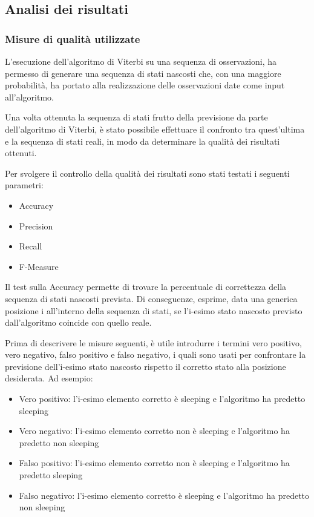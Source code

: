 \documentclass[10pt,a4paper]{article}
\begin{document}
	
	\subsection{Analisi dei risultati}
	
	
	\subsubsection{Misure di qualità utilizzate}
	
	L'esecuzione dell'algoritmo di Viterbi su una sequenza di osservazioni, ha permesso di generare una sequenza di stati nascosti che, con una maggiore probabilità, ha portato alla realizzazione delle osservazioni date come input all'algoritmo.
	
	Una volta ottenuta la sequenza di stati frutto della previsione da parte dell'algoritmo di Viterbi, è stato possibile effettuare il confronto tra quest'ultima e la sequenza di stati reali, in modo da determinare la qualità dei risultati ottenuti.
	
	Per svolgere il controllo della qualità dei risultati sono stati testati i seguenti parametri:
	
	\begin{itemize}
		\item Accuracy
		\item Precision
		\item Recall
		\item F-Measure
	\end{itemize}

	Il test sulla Accuracy permette di trovare la percentuale di correttezza della sequenza di stati nascosti prevista. Di conseguenze, esprime, data una generica posizione i all'interno della sequenza di stati, se l'i-esimo stato nascosto previsto dall'algoritmo coincide con quello reale.
	
	Prima di descrivere le misure seguenti, è utile introdurre i termini vero positivo, vero negativo, falso positivo e falso negativo, i quali sono usati per confrontare la previsione dell'i-esimo stato nascosto rispetto il corretto stato alla posizione desiderata. Ad esempio:

	\begin{itemize}
		\item Vero positivo: l'i-esimo elemento corretto è sleeping e l'algoritmo ha predetto sleeping
		\item Vero negativo: l'i-esimo elemento corretto non è sleeping e l'algoritmo ha predetto non sleeping
		\item Falso positivo: l'i-esimo elemento corretto non è sleeping e l'algoritmo ha predetto sleeping
		\item Falso negativo: l'i-esimo elemento corretto è sleeping e l'algoritmo ha predetto non sleeping
	\end{itemize}	
	
\end{document}
